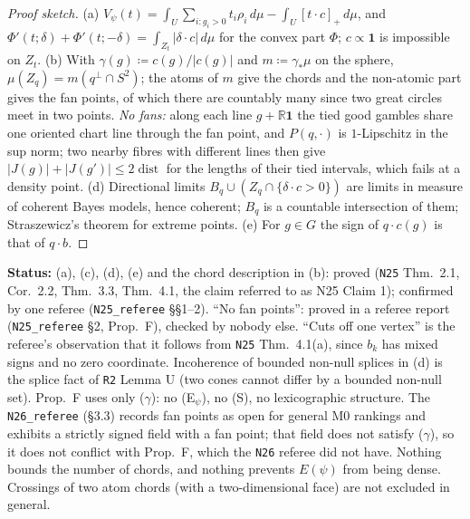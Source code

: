 \documentclass[11pt]{article}
\theoremstyle{definition}
\theoremstyle{remark}
\newcommand{\R}{\mathbb R}
\newcommand{\one}{\mathbf 1}
\newcommand{\src}[1]{\texttt{#1}}
\newcommand{\status}[1]{\par\smallskip\noindent\textbf{Status:} #1\par\smallskip}
\begin{document}
\begin{proof}[Proof sketch]
(a) $V_\psi(t)=\int_U\sum_{i:g_i>0}t_i\rho_i\,d\mu-\int_U[t\cdot c]_+\,d\mu$, and $\Phi'(t;\delta)+\Phi'(t;-\delta)=\int_{Z_t}|\delta\cdot c|\,d\mu$ for the convex part $\Phi$; $c\propto\one$ is impossible on $Z_t$. (b) With $\gamma(g)\coloneqq c(g)/|c(g)|$ and $m\coloneqq\gamma_*\mu$ on the sphere, $\mu(Z_q)=m(q^\perp\cap S^2)$; the atoms of $m$ give the chords and the non-atomic part gives the fan points, of which there are countably many since two great circles meet in two points. \emph{No fans:} along each line $g+\R\one$ the tied good gambles share one oriented chart line through the fan point, and $P(q,\cdot)$ is $1$-Lipschitz in the sup norm; two nearby fibres with different lines then give $|J(g)|+|J(g')|\le2\operatorname{dist}$ for the lengths of their tied intervals, which fails at a density point. (d) Directional limits $B_q\cup(Z_q\cap\{\delta\cdot c>0\})$ are limits in measure of coherent Bayes models, hence coherent; $B_q$ is a countable intersection of them; Straszewicz's theorem for extreme points. (e) For $g\in G$ the sign of $q\cdot c(g)$ is that of $q\cdot b$.
\end{proof}
\status{(a), (c), (d), (e) and the chord description in (b): proved (\src{N25} Thm.~2.1, Cor.~2.2, Thm.~3.3, Thm.~4.1, the claim referred to as N25 Claim 1); confirmed by one referee (\src{N25\_referee} \S\S1--2). ``No fan points'': proved in a referee report (\src{N25\_referee} \S2, Prop.~F), checked by nobody else. ``Cuts off one vertex'' is the referee's observation that it follows from \src{N25} Thm.~4.1(a), since $b_k$ has mixed signs and no zero coordinate. Incoherence of bounded non-null splices in (d) is the splice fact of \src{R2} Lemma U (two cones cannot differ by a bounded non-null set). Prop.~F uses only ($\gamma$): no (E$_\psi$), no (S), no lexicographic structure. The \src{N26\_referee} (\S3.3) records fan points as open for general M0 rankings and exhibits a strictly signed field with a fan point; that field does not satisfy ($\gamma$), so it does not conflict with Prop.~F, which the \src{N26} referee did not have. Nothing bounds the number of chords, and nothing prevents $E(\psi)$ from being dense. Crossings of two atom chords (with a two-dimensional face) are not excluded in general.}
\end{document}
